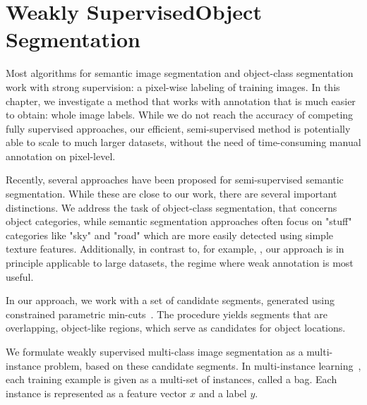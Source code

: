 \chapter[Weakly Supervised Object Segmentation]{Weakly Supervised\linebreak Object Segmentation}\label{ch:semi_supervised}

Most algorithms for semantic image segmentation and object-class segmentation
work with strong supervision: a pixel-wise labeling of training images. In this
chapter, we investigate a method that works with annotation that is much
easier to obtain: whole image labels.
While we do not reach the accuracy of competing fully supervised approaches,
our efficient, semi-supervised method is potentially able to scale to much
larger datasets, without the need of time-consuming manual annotation on
pixel-level.

Recently, several approaches have been proposed for semi-supervised semantic
segmentation.  While these are close to our work, there are several important
distinctions.  We address the task of object-class segmentation, that concerns
object categories, while semantic segmentation approaches often focus on
"stuff" categories like "sky" and "road" which are more easily detected using
simple texture features.
Additionally, in contrast to, for example, \citet{vezhnevets2011weakly}, our approach is in
principle applicable to large datasets, the regime where weak annotation is
most useful.

In our approach, we work with a set of candidate segments, generated using
constrained parametric min-cuts~\citep{carreira2010constrained}.  The procedure yields
segments that are overlapping, object-like regions, which serve as candidates
for object locations.

We formulate weakly supervised multi-class image segmentation as a
multi-instance problem, based on these candidate segments.  In multi-instance
learning~\citep{dietterich1997solving}, each training example is given as a
multi-set of instances, called a bag.  Each instance is represented as a
feature vector $x$ and a label $y$.

